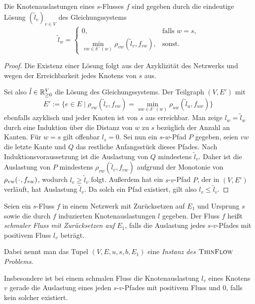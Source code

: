 \begin{proposition}\label{prop-congestion-labels-dijkstra}
	Die Knotenauslastungen eines $s$-Flusses $f$ sind gegeben durch die eindeutige Lösung $(\tilde{l}_v)_{v\in V}$ des Gleichungssystems
	\[
	\tilde{l}_w = \begin{cases}
		0, & \text{falls $w=s$,}\\
		\min_{vw\in \delta^-(w)} \rho_{vw}(\tilde{l}_v, f_{vw}), & \text{sonst.}
	\end{cases}
	\]
\end{proposition}
\begin{proof}
	Die Existenz einer Lösung folgt aus der Azyklizität des Netzwerks und wegen der Erreichbarkeit jedes Knotens von $s$ aus.
	
	Sei also $\tilde{l}\in\mathbb{R}_{\geq 0}^V$ die Lösung des Gleichungssystems.
	Der Teilgraph $(V, E')$ mit \[
	E':= \{ e\in E \mid \rho_{vw}(\tilde{l}_v, f_{vw}) = \min_{uw\in\delta^-(w)}  \rho_{uw}(\tilde{l}_u, f_{uw}) \}
	\]
	ebenfalls azyklisch und jeder Knoten ist von $s$ aus erreichbar.
	Man zeige $l_w = \tilde{l}_w$ durch eine Induktion über die Distanz von $w$ zu $s$ bezüglich der Anzahl an Kanten.
	Für $w=s$ gilt offenbar $l_s = 0$.
	Sei nun ein $s$-$w$-Pfad $P$ gegeben, seien $vw$ die letzte Kante und $Q$ das restliche Anfangsstück dieses Pfades.
	Nach Induktionsvoraussetzung ist die Auslastung von $Q$ mindestens $\tilde{l}_v$.
	Daher ist die Auslastung von $P$ mindestens $\rho_{vw}(\tilde{l}_v, f_{vw})$ aufgrund der Monotonie von $\rho_{vw}(\PlH, f_{vw})$, wodurch $l_v \geq \tilde{l}_v$ folgt.
	Außerdem hat ein $s$-$v$-Pfad $P$, der in $(V, E')$ verläuft, hat Auslastung $\tilde{l}_v$.
	Da solch ein Pfad existiert, gilt also $l_v \leq \tilde{l}_v$.
\end{proof}

\newcommand{\problemThinFlow}{\textsc{ThinFlow}}
\begin{definition}
	Seien ein $s$-Fluss $f$ in einem Netzwerk mit Zurück\-setzen auf $E_1$ und Ursprung $s$ sowie die durch $f$ induzierten Knotenauslastungen $l$ gegeben.
	Der Fluss $f$ heißt \emph{schmaler Fluss mit Zurücksetzen auf $E_1$}, falls die Auslastung jedes $s$-$v$-Pfades mit positivem Fluss $l_v$ beträgt.
	
	Dabei nennt man das Tupel $(V, E, u, s, b, E_1)$ eine \emph{Instanz des $\problemThinFlow$ Problems}.
	
\end{definition}

Insbesondere ist bei einem schmalen Fluss die Knotenauslastung $l_v$ eines Knotens $v$ gerade die Auslastung eines jeden $s$-$v$-Pfades mit positivem Fluss und $0$, falls kein solcher existiert.

